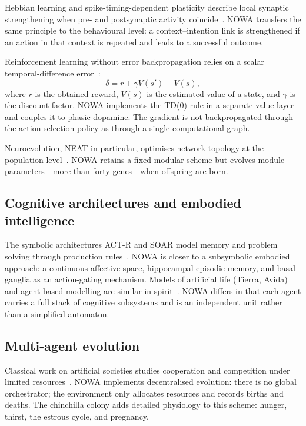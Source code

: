\documentclass[11pt,a4paper]{article}
\begin{document}
Hebbian learning and spike-timing-dependent plasticity describe local synaptic strengthening when pre- and postsynaptic activity coincide~\cite{hebb1949,bi1998}. NOWA transfers the same principle to the behavioural level: a context--intention link is strengthened if an action in that context is repeated and leads to a successful outcome.

Reinforcement learning without error backpropagation relies on a scalar temporal-difference error~\cite{sutton2018}:
\begin{equation}
\delta = r + \gamma V(s') - V(s),
\end{equation}
where \(r\) is the obtained reward, \(V(s)\) is the estimated value of a state, and \(\gamma\) is the discount factor. NOWA implements the TD(0) rule in a separate value layer and couples it to phasic dopamine. The gradient is not backpropagated through the action-selection policy as through a single computational graph.

Neuroevolution, NEAT in particular, optimises network topology at the population level~\cite{stanley2002}. NOWA retains a fixed modular scheme but evolves module parameters---more than forty genes---when offspring are born.

\subsection{Cognitive architectures and embodied intelligence}

The symbolic architectures ACT-R and SOAR model memory and problem solving through production rules~\cite{anderson2004}. NOWA is closer to a subsymbolic embodied approach: a continuous affective space, hippocampal episodic memory, and basal ganglia as an action-gating mechanism. Models of artificial life (Tierra, Avida) and agent-based modelling are similar in spirit~\cite{epstein1996,ray1991}. NOWA differs in that each agent carries a full stack of cognitive subsystems and is an independent unit rather than a simplified automaton.

\subsection{Multi-agent evolution}

Classical work on artificial societies studies cooperation and competition under limited resources~\cite{epstein1996}. NOWA implements decentralised evolution: there is no global orchestrator; the environment only allocates resources and records births and deaths. The chinchilla colony adds detailed physiology to this scheme: hunger, thirst, the estrous cycle, and pregnancy.
\end{document}
